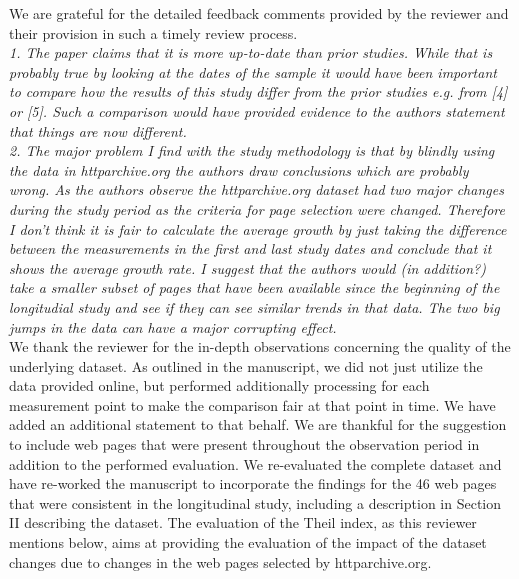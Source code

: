 \documentclass[11pt, draftclsnofoot, onecolumn]{IEEEtran}
\begin{document}
{{We are grateful for the detailed feedback comments provided by the reviewer and their provision in such a timely review process.\\



\noindent \textit{1. The paper claims that it is more up-to-date than prior studies. While that is probably true by looking at the dates of the sample it would have been important to compare how the results of this study differ from the prior studies e.g. from [4] or [5]. Such a comparison would have provided evidence to the authors statement that things are now different.}\\

\noindent \textit{2. The major problem I find with the study methodology is that by blindly using the data in httparchive.org the authors draw conclusions which are probably wrong. As the authors observe the httparchive.org dataset had two major changes during the study period as the criteria for page selection were changed. Therefore I don't think it is fair to calculate the average growth by just taking the difference between the measurements in the first and last study dates and conclude that it shows the average growth rate. I suggest that the authors would (in addition?) take a smaller subset of pages that have been available since the beginning of the longitudial study and see if they can see similar trends in that data. The two big jumps in the data can have a major corrupting effect.}\\
We thank the reviewer for the in-depth observations concerning the quality of the underlying dataset. 
As outlined in the manuscript, we did not just utilize the data provided online, but performed additionally processing for each measurement point to make the comparison fair at that point in time. We have added an additional statement to that behalf.
We are thankful for the suggestion to include web pages that were present throughout the observation period in addition to the performed evaluation. We re-evaluated the complete dataset and have re-worked the manuscript to incorporate the findings for the 46 web pages that were consistent in the longitudinal study, including a description in Section II describing the dataset. 
The evaluation of the Theil index, as this reviewer mentions below, aims at providing the evaluation of the impact of the dataset changes due to changes in the web pages selected by httparchive.org.
\\


}}
\end{document}
